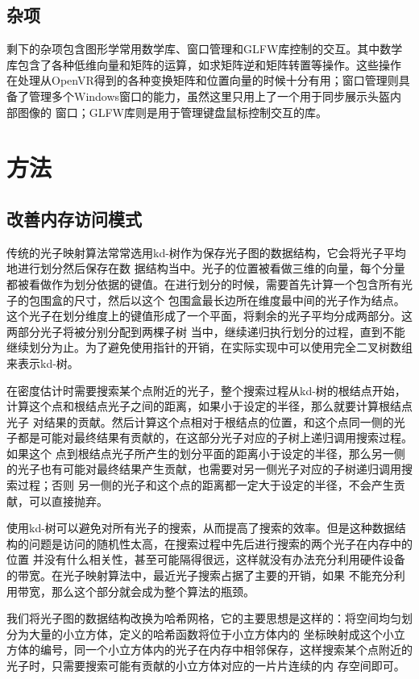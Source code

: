 \documentclass[UTF8]{ctexart}
\begin{document}
    \subsection{杂项}
        剩下的杂项包含图形学常用数学库、窗口管理和GLFW库控制的交互。其中数学库包含了各种低维向量和矩阵的运算，如求矩阵逆和矩阵转置等操作。这些操作
        在处理从OpenVR得到的各种变换矩阵和位置向量的时候十分有用；窗口管理则具备了管理多个Windows窗口的能力，虽然这里只用上了一个用于同步展示头盔内部图像的
        窗口；GLFW库则是用于管理键盘鼠标控制交互的库。
\section{方法}
    \subsection{改善内存访问模式}
        传统的光子映射算法\cite{jensen2000practical}常常选用kd-树\cite{1975Multidimensional}作为保存光子图的数据结构，它会将光子平均地进行划分然后保存在数
        据结构当中。光子的位置被看做三维的向量，每个分量都被看做作为划分依据的键值。在进行划分的时候，需要首先计算一个包含所有光子的包围盒的尺寸，然后以这个
        包围盒最长边所在维度最中间的光子作为结点。这个光子在划分维度上的键值形成了一个平面，将剩余的光子平均分成两部分。这两部分光子将被分别分配到两棵子树
        当中，继续递归执行划分的过程，直到不能继续划分为止。为了避免使用指针的开销，在实际实现中可以使用完全二叉树数组来表示kd-树。
        
        在密度估计时需要搜索某个点附近的光子，整个搜索过程从kd-树的根结点开始，计算这个点和根结点光子之间的距离，如果小于设定的半径，那么就要计算根结点光子
        对结果的贡献。然后计算这个点相对于根结点的位置，和这个点同一侧的光子都是可能对最终结果有贡献的，在这部分光子对应的子树上递归调用搜索过程。如果这个
        点到根结点光子所产生的划分平面的距离小于设定的半径，那么另一侧的光子也有可能对最终结果产生贡献，也需要对另一侧光子对应的子树递归调用搜索过程；否则
        另一侧的光子和这个点的距离都一定大于设定的半径，不会产生贡献，可以直接抛弃。
        
        使用kd-树可以避免对所有光子的搜索，从而提高了搜索的效率。但是这种数据结构的问题是访问的随机性太高，在搜索过程中先后进行搜索的两个光子在内存中的位置
        并没有什么相关性，甚至可能隔得很远，这样就没有办法充分利用硬件设备的带宽。在光子映射算法中，最近光子搜索占据了主要的开销\cite{gupte2011real}，如果
        不能充分利用带宽，那么这个部分就会成为整个算法的瓶颈。
        
        我们将光子图的数据结构改换为哈希网格\cite{fleisz2009photon}，它的主要思想是这样的：将空间均匀划分为大量的小立方体，定义的哈希函数将位于小立方体内的
        坐标映射成这个小立方体的编号，同一个小立方体内的光子在内存中相邻保存，这样搜索某个点附近的光子时，只需要搜索可能有贡献的小立方体对应的一片片连续的内
        存空间即可。
        
\end{document}
